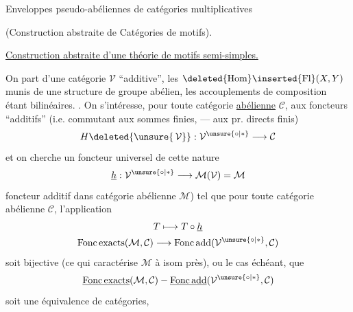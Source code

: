 
Enveloppes pseudo-abéliennes
de catégories multiplicatives

(Construction abstraite de
Catégories de motifs).

\uline{Construction abstraite d'une théorie de motifs semi-simples.}

On part d'une catégorie \(\mathcal V\)
``additive'', 
 les
\(\deleted{\operatorname{Hom}}\inserted{\operatorname{Fl}}(X,Y)\)
 munis de une structure de
groupe abélien, les accouplements de composition
étant bilinéaires.
.
On s'intéresse, pour
toute catégorie \uline{abélienne} \(\mathcal C\), aux foncteurs
 ``additifs''
(i.e. commutant aux sommes
finies, ---  aux pr. directs finis)
\[
H\deleted{\unsure{\,\mathcal V}}:
\mathcal V^{\unsure{\circ|*}}\longrightarrow\mathcal C
\]
et on cherche un foncteur universel
de cette nature
\[
\underline h:\mathcal V^{\unsure{\circ|*}}\longrightarrow\mathcal M(\mathcal V)=\mathcal M
\]
foncteur additif dans catégorie abélienne \(\mathcal M\)) tel
que pour toute catégorie abélienne \(\mathcal C\),
l'application
\[
\begin{gathered}
T\longmapsto T\circ\underline h\\
\operatorname{Fonc\,exacts}(\mathcal M,\mathcal C)
\longrightarrow\operatorname{Fonc\,add}(\mathcal V^{\unsure{\circ|*}},\mathcal C)
\end{gathered}
\]
soit bijective (ce qui caractérise \(\mathcal M\) à 
isom près), ou le cas échéant, que
\[
\underline{\operatorname{Fonc\,exacts}}(\mathcal M,\mathcal C)
\mathbin{-}
\underline{\operatorname{Fonc\,add}}(\mathcal V^{\unsure{\circ|*}},\mathcal C)
\]
soit une équivalence de catégories, 

